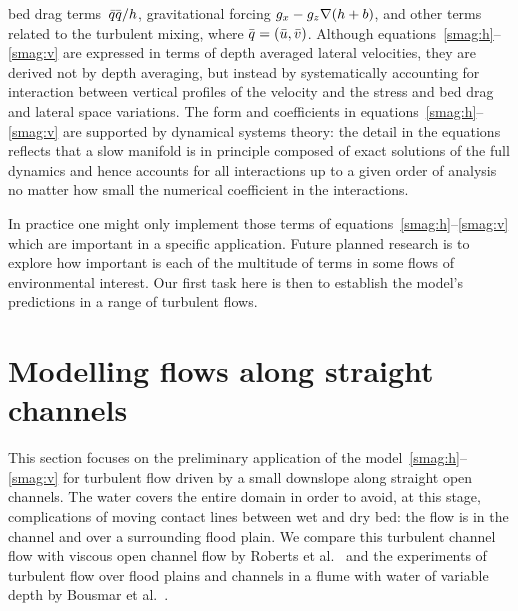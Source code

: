 \documentclass[a5paper,12pt]{article}
\newcommand{\uu}{{\bar u}}
\newcommand{\vv}{{\bar v}}
\newcommand{\bq}{{\bar q}}
\newcommand{\qq}{{\bar{\vec q}}}
\renewcommand{\vec}[1]{\text{\boldmath$#1$}}
\begin{document}
bed drag terms~$\bq{\qq}/{h}$, gravitational forcing $g_x-g_z{\grad(h+b)}$, and other terms related to the turbulent mixing, where $\qq=(\uu,\vv)$. 
Although equations~\eqref{smag:h}--\eqref{smag:v} are expressed in terms of depth averaged lateral velocities, they are derived not by depth averaging, but instead by systematically accounting for interaction between vertical profiles of the velocity and the stress and bed drag and lateral space variations. 
The form and coefficients in equations~\eqref{smag:h}--\eqref{smag:v} are supported by dynamical systems theory: the detail in the equations reflects that a slow manifold is in principle composed of exact solutions of the full dynamics and hence accounts for all interactions up to a given order of analysis no matter how small the numerical coefficient in the interactions.

In practice one might only implement those terms of equations~\eqref{smag:h}--\eqref{smag:v} which are important in a specific application.
Future planned research is to explore how important is each of the multitude of terms in some flows of environmental interest.
Our first task here is then to establish the model's predictions in a range of turbulent flows.

\section{Modelling flows along straight channels}




This section focuses on the preliminary application of the model~\eqref{smag:h}--\eqref{smag:v} for turbulent flow driven by a small downslope along straight open channels.
The water covers the entire domain in order to avoid, at this stage, complications of moving contact lines between wet and dry bed: the flow is in the channel and over a surrounding flood plain.
We compare this turbulent channel flow with viscous open channel flow by Roberts et al.~\cite{Robertsli2006} and the experiments of turbulent flow over flood plains and channels in a flume with water of variable depth by Bousmar et al.~\cite{Bousmar2002,Bousmar2003a}.
\end{document}
